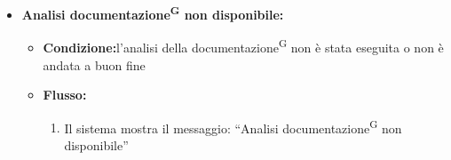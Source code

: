 \documentclass[a4paper, 11pt]{article}
\begin{document}
\begin{itemize}
\begin{itemize}
			\begin{itemize}
				\item \textbf{Condizione:}La repository non contiene documentazione\textsuperscript{G} analizzabile
				\item \textbf{Flusso:} 
				\begin{enumerate}
					\item Il sistema mostra il messaggio: “Documentazione\textsuperscript{G} assente”
				\end{enumerate}
			\end{itemize}
		\item \textbf{Analisi documentazione\textsuperscript{G} non disponibile:} 
			\begin{itemize}
				\item \textbf{Condizione:}l'analisi della documentazione\textsuperscript{G} non è stata eseguita o non è andata a buon fine
				\item \textbf{Flusso:} 
				\begin{enumerate}
					\item Il sistema mostra il messaggio: “Analisi documentazione\textsuperscript{G} non disponibile”
				\end{enumerate}
			\end{itemize}
	\end{itemize}
\end{itemize}
\end{document}
